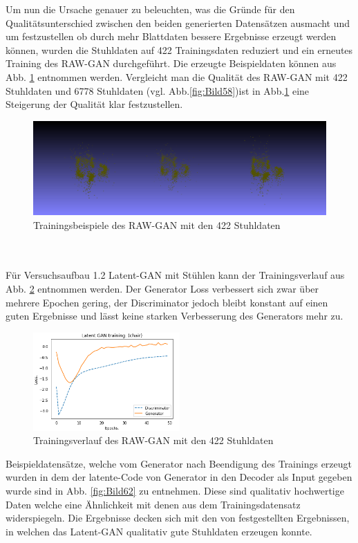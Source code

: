 \documentclass{llncs}
\begin{document}
\pagebreak\linebreak 
Um nun die Ursache genauer zu beleuchten, was die Gründe für  den Qualitätsunterschied zwischen den beiden generierten Datensätzen ausmacht und um festzustellen ob durch mehr Blattdaten bessere Ergebnisse erzeugt werden können, wurden die Stuhldaten auf 422 Trainingsdaten reduziert und ein erneutes Training des RAW-GAN durchgeführt. Die erzeugte Beispieldaten können aus Abb. \ref{fig:Bild60} entnommen werden. Vergleicht man die Qualität des RAW-GAN mit 422 Stuhldaten und 
6778 Stuhldaten (vgl. Abb.\ref{fig:Bild58})ist in Abb.\ref{fig:Bild60} eine Steigerung der Qualität klar festzustellen. 
\begin{figure}[htbp] 
	\centering
	\includegraphics[width=1.0\textwidth]{raw_gan_result_400_result.png}
	\caption{Trainingsbeispiele des RAW-GAN mit den 422 Stuhldaten}
	\label{fig:Bild60}
\end{figure}
~\\\\
Für Versuchsaufbau 1.2 Latent-GAN mit Stühlen kann der Trainingsverlauf aus Abb. \ref{fig:Bild61} entnommen werden. Der Generator Loss verbessert sich zwar über mehrere Epochen gering, der Discriminator jedoch bleibt konstant auf einen guten Ergebnisse und lässt keine starken Verbesserung des Generators mehr zu. 
\begin{figure}[htbp] 
	\centering
	\includegraphics[width=0.5\textwidth]{latent_gan_chair_result.png}
	\caption{Trainingsverlauf des RAW-GAN mit den 422 Stuhldaten}
	\label{fig:Bild61}
\end{figure}
Beispieldatensätze, welche vom Generator nach Beendigung des Trainings erzeugt wurden in dem der latente-Code von Generator in den Decoder als Input gegeben wurde sind in Abb. \ref{fig:Bild62} zu entnehmen. Diese sind qualitativ hochwertige Daten welche eine Ähnlichkeit mit denen aus dem Trainingsdatensatz widerspiegeln. Die Ergebnisse decken sich mit den von \cite{3dgan} festgestellten Ergebnissen, in welchen das Latent-GAN qualitativ gute Stuhldaten erzeugen konnte. 
\end{document}
